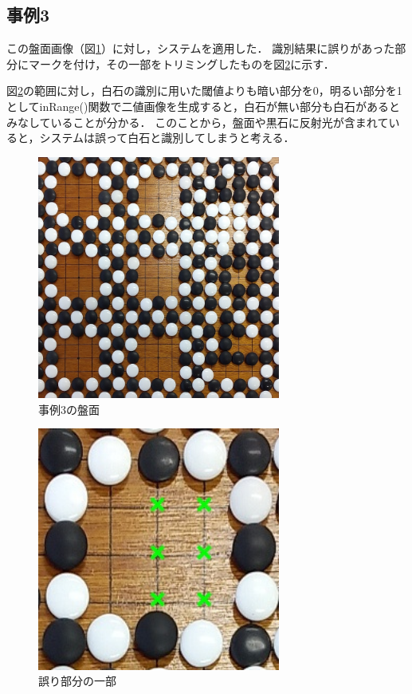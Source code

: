 \documentclass[summary]{nitocs}
\numberwithin{equation}{section}
\begin{document}
        \subsection{事例3} %
            この盤面画像（図\ref{ex3}）に対し，システムを適用した．
            識別結果に誤りがあった部分にマークを付け，その一部をトリミングしたものを図\ref{ex3_error}に示す．

            図\ref{ex3_error}の範囲に対し，白石の識別に用いた閾値よりも暗い部分を0，明るい部分を1としてinRange()関数で二値画像を生成すると，白石が無い部分も白石があるとみなしていることが分かる．
            このことから，盤面や黒石に反射光が含まれていると，システムは誤って白石と識別してしまうと考える．
            \begin{figure}[tb] %
                \begin{center}
                \includegraphics[clip,width=80mm]{DSC_0098/boardImg.jpg} 
                \caption{事例3の盤面}
                \label{ex3}
                \end{center}
            \end{figure}

            \begin{figure}[tb] %
                \begin{center}
                \includegraphics[clip,width=80mm]{DSC_0098/TRIM_resultCompare.jpg} 
                \caption{誤り部分の一部}
                \label{ex3_error}
                \end{center}
            \end{figure}
\end{document}
